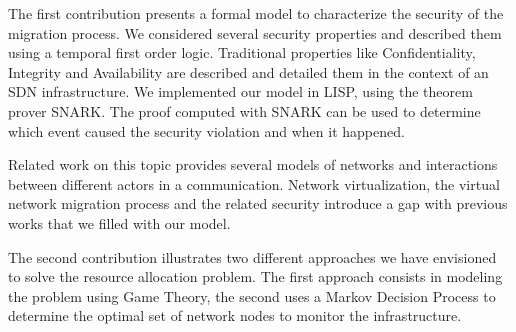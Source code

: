 The first contribution presents a formal model to characterize the security of the migration process. We considered several security properties and described them using a temporal first order logic. Traditional properties like Confidentiality, Integrity and Availability are described and detailed them in the context of an SDN infrastructure.
We implemented our model in LISP, using the theorem prover SNARK.
The proof computed with SNARK can be used to determine which event caused the security violation and when it happened.

Related work on this topic provides several models of networks and interactions between different actors in a communication. Network virtualization, the virtual network migration process and the related security introduce a gap with previous works that we filled with our model.

The second contribution illustrates two different approaches we have envisioned to solve the resource allocation problem. The first approach consists in modeling the problem using Game Theory, the second uses a Markov Decision Process to determine the optimal set of network nodes to monitor the infrastructure.


